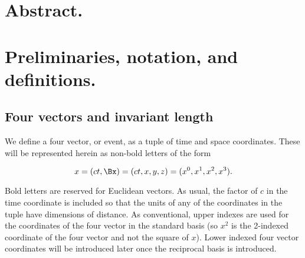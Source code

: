 \documentclass[iop,tighten]{emulateapj}
\begin{document}
%
%
%
%
%
%
%
%
%
%
%




\section{Abstract.}


\section{Preliminaries, notation, and definitions.}

\subsection{Four vectors and invariant length}

We define a four vector, or event, as a tuple of time and space coordinates.  These will be represented herein as non-bold letters of the form

\begin{equation}\label{eqn:grahamSchmidtLorentz:10}
x = (c t, \Bx) = ( c t, x, y, z ) = ( x^0, x^1, x^2, x^3 ).
\end{equation}

Bold letters are reserved for Euclidean vectors.  As usual, the factor of $c$ in the time coordinate is included so that the units of any of the coordinates in the tuple have dimensions of distance.  As conventional, upper indexes are used for the coordinates of the four vector in the standard basis (so $x^2$ is the 2-indexed coordinate of the four vector and not the square of $x$).  Lower indexed four vector coordinates will be introduced later once the reciprocal basis is introduced.
\end{document}
